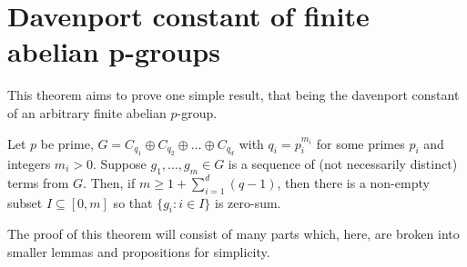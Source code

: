 \chapter{Davenport constant of finite abelian p-groups}
This theorem aims to prove one simple result, that being the davenport constant of an arbitrary finite abelian \(p\)-group.
\begin{theorem}
	Let \(p\) be prime, \(G = C_{q_1} \oplus C_{q_2} \oplus \ldots \oplus C_{q_{d}}\) with \(q_{i} = p_{i}^{m_{i}}\) for some primes \(p_{i}\) and integers \(m_{i} > 0\). Suppose \(g_1, \ldots, g_{m} \in G\) is a sequence of (not necessarily distinct) terms from \(G\). Then, if \(m\ge 1 + \sum_{i= 1}^{d} \left( q-1 \right) \), then there is a non-empty subset \(I \subseteq \left[ 0, m \right]  \) so that \(\{g_{i} : i \in I\} \) is zero-sum.
\end{theorem}
The proof of this theorem will consist of many parts which, here, are broken into smaller lemmas and propositions for simplicity.
